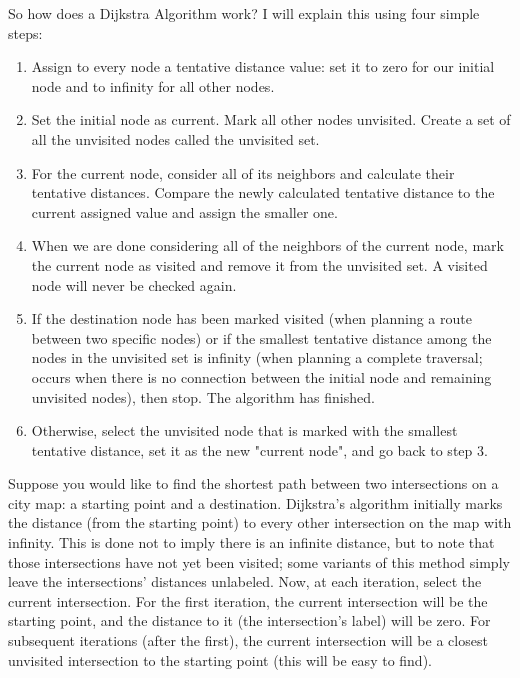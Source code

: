 	So how does a Dijkstra Algorithm work? I will explain this using four simple steps:
	\begin{enumerate}
		\item Assign to every node a tentative distance value: set it to zero for our initial node and to infinity for all other nodes.
	
		\item Set the initial node as current. Mark all other nodes unvisited. Create a set of all the unvisited nodes called the unvisited set.
	
		\item For the current node, consider all of its neighbors and calculate their tentative distances. Compare the newly calculated tentative distance to the current assigned value and assign the smaller one. 
	
		\item When we are done considering all of the neighbors of the current node, mark the current node as visited and remove it from the unvisited set. A visited node will never be checked again.
	
		\item If the destination node has been marked visited (when planning a route between two specific nodes) or if the smallest tentative distance among the nodes in the unvisited set is infinity (when planning a complete traversal; occurs when there is no connection between the initial node and remaining unvisited nodes), then stop. The algorithm has finished.
	
		\item Otherwise, select the unvisited node that is marked with the smallest tentative distance, set it as the new "current node", and go back to step 3.
	\end{enumerate}
	Suppose you would like to find the shortest path between two intersections on a city map: a starting point and a destination. Dijkstra's algorithm initially marks the distance (from the starting point) to every other intersection on the map with infinity. This is done not to imply there is an infinite distance, but to note that those intersections have not yet been visited; some variants of this method simply leave the intersections' distances unlabeled. Now, at each iteration, select the current intersection. For the first iteration, the current intersection will be the starting point, and the distance to it (the intersection's label) will be zero. For subsequent iterations (after the first), the current intersection will be a closest unvisited intersection to the starting point (this will be easy to find).
	

